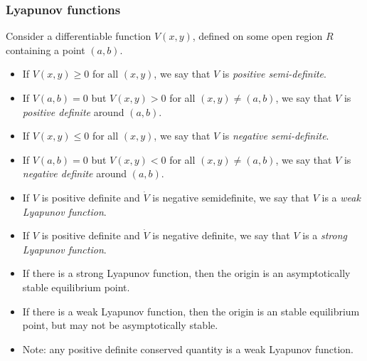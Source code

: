 \documentclass[9pt]{beamer}
\begin{document}
\begin{frame}[t]
 \frametitle{Lyapunov functions}

 \begin{definition*}{}
  Consider a differentiable function $V(x,y)$, defined on some open region $R$ containing
  a point $(a,b)$.
  \begin{itemize}
   \item<2-> If $V(x,y)\geq 0$ for all $(x,y)$, we say that $V$ is
    \emph{positive semi-definite}.
   \item<3-> If $V(a,b)=0$ but $V(x,y)>0$ for all $(x,y)\neq(a,b)$, we
    say that $V$ is \emph{positive definite} around $(a,b)$.
   \item<4-> If $V(x,y)\leq 0$ for all $(x,y)$, we say that $V$ is
    \emph{negative semi-definite}.
   \item<5-> If $V(a,b)=0$ but $V(x,y)<0$ for all $(x,y)\neq(a,b)$, we
    say that $V$ is \emph{negative definite} around $(a,b)$.
  \end{itemize}
 \end{definition*}

 \begin{itemize}
  \item<9-> If $V$ is positive definite and $\dot{V}$ is negative semidefinite, 
   we say that $V$ is a \emph{weak Lyapunov function}.
  \item<10-> If $V$ is positive definite and $\dot{V}$ is negative definite, 
   we say that $V$ is a \emph{strong Lyapunov function}.
  \item<11-> If there is a strong Lyapunov function, then the origin is an
   asymptotically stable equilibrium point.
  \item<12-> If there is a weak Lyapunov function, then the origin is an
   stable equilibrium point, but may not be asymptotically stable.
  \item<13-> Note: any positive definite conserved quantity is a weak Lyapunov function.
 \end{itemize}
\end{frame}
\end{document}
